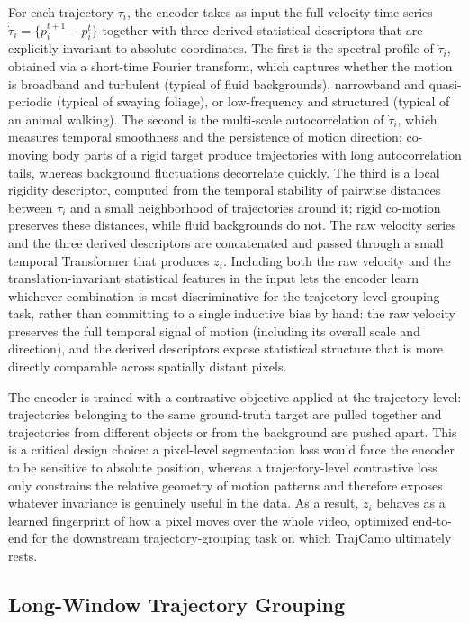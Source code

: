 \documentclass[11pt]{article}
\begin{document}
For each trajectory $\tau_i$, the encoder takes as input the full velocity time series $\dot{\tau}_i=\{p_i^{t+1}-p_i^t\}$ together with three derived statistical descriptors that are explicitly invariant to absolute coordinates.
The first is the spectral profile of $\dot{\tau}_i$, obtained via a short-time Fourier transform, which captures whether the motion is broadband and turbulent (typical of fluid backgrounds), narrowband and quasi-periodic (typical of swaying foliage), or low-frequency and structured (typical of an animal walking).
The second is the multi-scale autocorrelation of $\dot{\tau}_i$, which measures temporal smoothness and the persistence of motion direction; co-moving body parts of a rigid target produce trajectories with long autocorrelation tails, whereas background fluctuations decorrelate quickly.
The third is a local rigidity descriptor, computed from the temporal stability of pairwise distances between $\tau_i$ and a small neighborhood of trajectories around it; rigid co-motion preserves these distances, while fluid backgrounds do not.
The raw velocity series and the three derived descriptors are concatenated and passed through a small temporal Transformer that produces $z_i$.
Including both the raw velocity and the translation-invariant statistical features in the input lets the encoder learn whichever combination is most discriminative for the trajectory-level grouping task, rather than committing to a single inductive bias by hand: the raw velocity preserves the full temporal signal of motion (including its overall scale and direction), and the derived descriptors expose statistical structure that is more directly comparable across spatially distant pixels.

The encoder is trained with a contrastive objective applied at the trajectory level: trajectories belonging to the same ground-truth target are pulled together and trajectories from different objects or from the background are pushed apart.
This is a critical design choice: a pixel-level segmentation loss would force the encoder to be sensitive to absolute position, whereas a trajectory-level contrastive loss only constrains the relative geometry of motion patterns and therefore exposes whatever invariance is genuinely useful in the data.
As a result, $z_i$ behaves as a learned fingerprint of how a pixel moves over the whole video, optimized end-to-end for the downstream trajectory-grouping task on which TrajCamo ultimately rests.

\subsection{Long-Window Trajectory Grouping}
\end{document}
